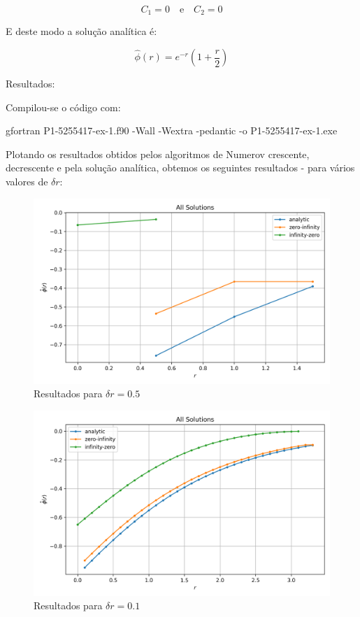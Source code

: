 \documentclass[12pt, a4paper]{article} %
\begin{document}
            \begin{equation*}
                C_{1} = 0 \quad \text{e} \quad C_{2} = 0
            \end{equation*}
            
            E deste modo a solu\c{c}\~ao anal\'itica \'e:

            \begin{equation*}
                \hat{\phi}(r) = e^{-r}\left(1 + \frac{r}{2}\right)
            \end{equation*}

        Resultados:

        Compilou-se o código com:

            gfortran P1-5255417-ex-1.f90 -Wall -Wextra -pedantic -o P1-5255417-ex-1.exe

        Plotando os resultados obtidos pelos algoritmos de Numerov crescente, decrescente e pela solu\c{c}\~ao anal\'itica, obtemos os seguintes resultados - para v\'arios valores de $\delta r$:
        \begin{figure}[H]
            \centering
            \includegraphics[scale=0.7]{../images/all-plots-0.5.png}
            \caption{Resultados para $\delta r = 0.5$}
            \label{fig:all-plots-0.5}
        \end{figure}
        \begin{figure}[H]
            \centering
            \includegraphics[scale=0.7]{../images/all-plots-0.1.png}
            \caption{Resultados para $\delta r = 0.1$}
            \label{fig:all-plots-0.1}
        \end{figure}
\end{document}
